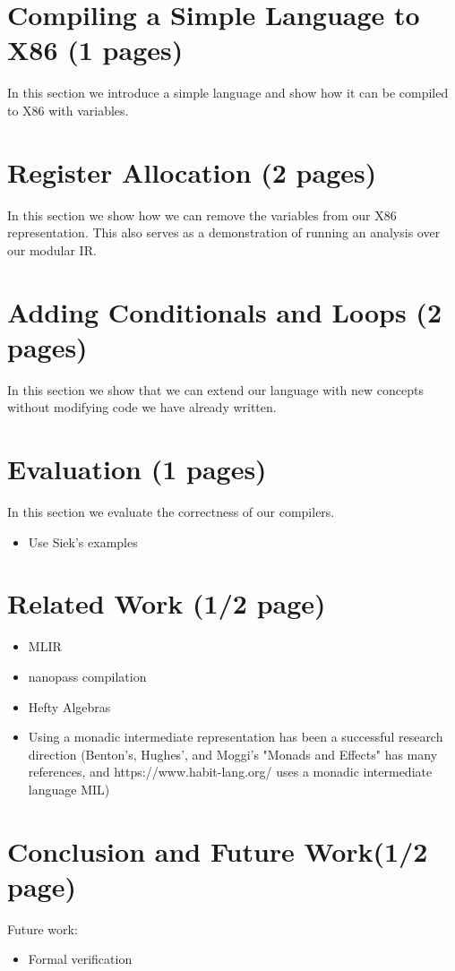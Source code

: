 \documentclass[sigplan,anonymous,review]{acmart}
\begin{document}
\section{Compiling a Simple Language to X86 (1 pages)} \label{sec:simple-lang}

In this section we introduce a simple language and show how it can be compiled to X86 with variables.

\section{Register Allocation (2 pages)} \label{sec:analysis}

In this section we show how we can remove the variables from our X86 representation.
This also serves as a demonstration of running an analysis over our modular IR.

\section{Adding Conditionals and Loops (2 pages)} \label{sec:cond-loops}

In this section we show that we can extend our language with new concepts without modifying code we have already written.

\section{Evaluation (1 pages)} \label{sec:evaluation}

In this section we evaluate the correctness of our compilers.

\begin{itemize}
  \item Use Siek's examples
\end{itemize}

\section{Related Work (1/2 page)} \label{sec:related}

\begin{itemize}
  \item MLIR
  \item nanopass compilation
  \item Hefty Algebras
  \item Using a monadic intermediate representation has been a successful research direction (Benton's, Hughes', and Moggi's "Monads and Effects" has many references, and https://www.habit-lang.org/ uses a monadic intermediate language MIL)
\end{itemize}

\section{Conclusion and Future Work(1/2 page)} \label{sec:conclusion}



Future work:
\begin{itemize}
  \item Formal verification
\end{itemize}
\end{document}
